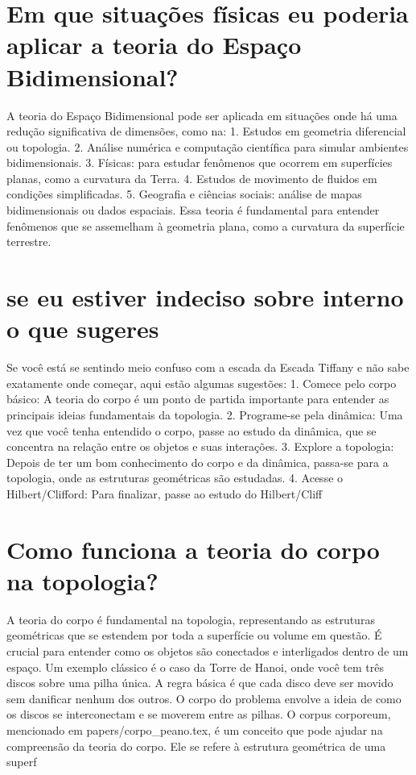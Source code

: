 \documentclass[11pt,a4paper]{article}
\begin{document}
\section{Em que situações físicas eu poderia aplicar a teoria do Espaço Bidimensional?}
A teoria do Espaço Bidimensional pode ser aplicada em situações onde há uma redução significativa de dimensões, como na: 1. Estudos em geometria diferencial ou topologia. 2. Análise numérica e computação científica para simular ambientes bidimensionais. 3. Físicas: para estudar fenômenos que ocorrem em superfícies planas, como a curvatura da Terra. 4. Estudos de movimento de fluidos em condições simplificadas. 5. Geografia e ciências sociais: análise de mapas bidimensionais ou dados espaciais. Essa teoria é fundamental para entender fenômenos que se assemelham à geometria plana, como a curvatura da superfície terrestre.

\section{se eu estiver indeciso sobre interno o que sugeres}
Se você está se sentindo meio confuso com a escada da Escada Tiffany e não sabe exatamente onde começar, aqui estão algumas sugestões: 1. Comece pelo corpo básico: A teoria do corpo é um ponto de partida importante para entender as principais ideias fundamentais da topologia. 2. Programe-se pela dinâmica: Uma vez que você tenha entendido o corpo, passe ao estudo da dinâmica, que se concentra na relação entre os objetos e suas interações. 3. Explore a topologia: Depois de ter um bom conhecimento do corpo e da dinâmica, passa-se para a topologia, onde as estruturas geométricas são estudadas. 4. Acesse o Hilbert/Clifford: Para finalizar, passe ao estudo do Hilbert/Cliff

\section{Como funciona a teoria do corpo na topologia?}
A teoria do corpo é fundamental na topologia, representando as estruturas geométricas que se estendem por toda a superfície ou volume em questão. É crucial para entender como os objetos são conectados e interligados dentro de um espaço. Um exemplo clássico é o caso da Torre de Hanoi, onde você tem três discos sobre uma pilha única. A regra básica é que cada disco deve ser movido sem danificar nenhum dos outros. O corpo do problema envolve a ideia de como os discos se interconectam e se moverem entre as pilhas. O corpus corporeum, mencionado em papers/corpo\_peano.tex, é um conceito que pode ajudar na compreensão da teoria do corpo. Ele se refere à estrutura geométrica de uma superf
\end{document}
